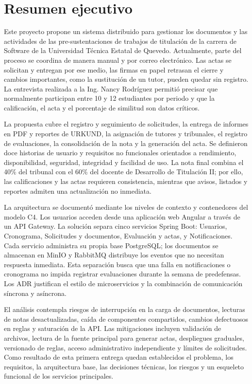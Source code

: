 \section{Resumen ejecutivo}

Este proyecto propone un sistema distribuido para gestionar los documentos y
las actividades de las pre-sustentaciones de trabajos de titulación de la
carrera de Software de la Universidad Técnica Estatal de Quevedo. Actualmente,
parte del proceso se coordina de manera manual y por correo electrónico. Las
actas se solicitan y entregan por ese medio, las firmas en papel retrasan el
cierre y cambios importantes, como la sustitución de un tutor, pueden quedar
sin registro. La entrevista realizada a la Ing. Nancy Rodríguez permitió
precisar que normalmente participan entre 10 y 12 estudiantes por periodo y
que la calificación, el acta y el porcentaje de similitud son datos críticos.

La propuesta cubre el registro y seguimiento de solicitudes, la entrega de
informes en PDF y reportes de URKUND, la asignación de tutores y tribunales, el
registro de evaluaciones, la consolidación de la nota y la generación del acta.
Se definieron doce historias de usuario y requisitos no funcionales orientados
a rendimiento, disponibilidad, seguridad, integridad y facilidad de uso. La
nota final combina el 40\% del tribunal con el 60\% del docente de Desarrollo
de Titulación II; por ello, las calificaciones y las actas requieren
consistencia, mientras que avisos, listados y reportes admiten una actualización
no inmediata.

La arquitectura se documentó mediante los niveles de contexto y contenedores
del modelo C4. Los usuarios acceden desde una aplicación web Angular a través
de un API Gateway. La solución separa cinco servicios Spring Boot: Usuarios,
Cronograma, Solicitudes y documentos, Evaluación y actas, y Notificaciones.
Cada servicio administra su propia base PostgreSQL; los documentos se almacenan
en MinIO y RabbitMQ distribuye los eventos que no necesitan respuesta
inmediata. Esta separación busca que una falla en notificaciones o cronograma
no impida registrar evaluaciones durante la semana de predefensas. Los ADR
justifican el estilo de microservicios y la combinación de comunicación
síncrona y asíncrona.

El análisis contempla riesgos de interrupción en la carga de documentos,
lecturas de notas desactualizadas, caída de componentes compartidos, cambios
defectuosos en reglas y saturación de la API. Las mitigaciones incluyen
validación de archivos, lectura de la fuente principal para generar actas,
despliegues graduales, versionado de reglas, acceso administrativo independiente
y límites de solicitudes. Como resultado de esta primera entrega quedan
establecidos el problema, los requisitos, la arquitectura base, las decisiones
técnicas, los riesgos y un esqueleto funcional de los servicios principales.
